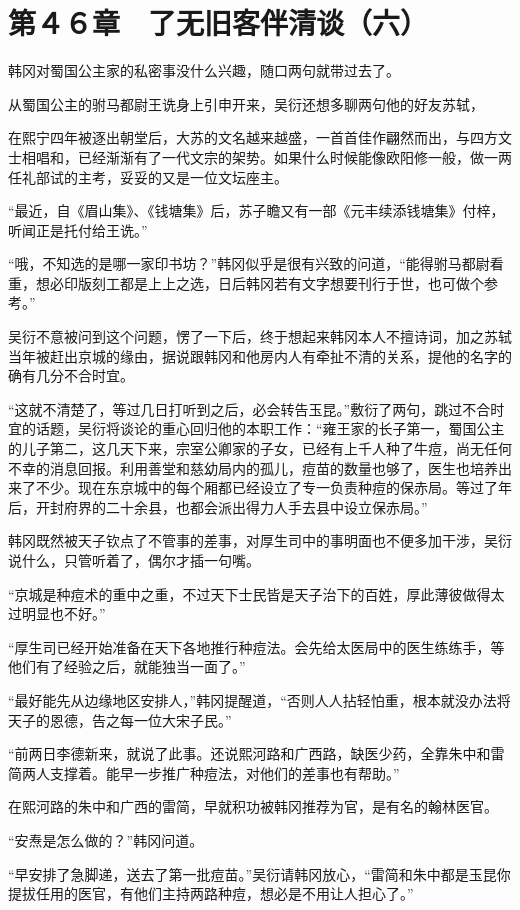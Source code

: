 \section{第４６章　了无旧客伴清谈（六）}

韩冈对蜀国公主家的私密事没什么兴趣，随口两句就带过去了。

从蜀国公主的驸马都尉王诜身上引申开来，吴衍还想多聊两句他的好友苏轼，

在熙宁四年被逐出朝堂后，大苏的文名越来越盛，一首首佳作翩然而出，与四方文士相唱和，已经渐渐有了一代文宗的架势。如果什么时候能像欧阳修一般，做一两任礼部试的主考，妥妥的又是一位文坛座主。

“最近，自《眉山集》、《钱塘集》后，苏子瞻又有一部《元丰续添钱塘集》付梓，听闻正是托付给王诜。”

“哦，不知选的是哪一家印书坊？”韩冈似乎是很有兴致的问道，“能得驸马都尉看重，想必印版刻工都是上上之选，日后韩冈若有文字想要刊行于世，也可做个参考。”

吴衍不意被问到这个问题，愣了一下后，终于想起来韩冈本人不擅诗词，加之苏轼当年被赶出京城的缘由，据说跟韩冈和他房内人有牵扯不清的关系，提他的名字的确有几分不合时宜。

“这就不清楚了，等过几日打听到之后，必会转告玉昆。”敷衍了两句，跳过不合时宜的话题，吴衍将谈论的重心回归他的本职工作：“雍王家的长子第一，蜀国公主的儿子第二，这几天下来，宗室公卿家的子女，已经有上千人种了牛痘，尚无任何不幸的消息回报。利用善堂和慈幼局内的孤儿，痘苗的数量也够了，医生也培养出来了不少。现在东京城中的每个厢都已经设立了专一负责种痘的保赤局。等过了年后，开封府界的二十余县，也都会派出得力人手去县中设立保赤局。”

韩冈既然被天子钦点了不管事的差事，对厚生司中的事明面也不便多加干涉，吴衍说什么，只管听着了，偶尔才插一句嘴。

“京城是种痘术的重中之重，不过天下士民皆是天子治下的百姓，厚此薄彼做得太过明显也不好。”

“厚生司已经开始准备在天下各地推行种痘法。会先给太医局中的医生练练手，等他们有了经验之后，就能独当一面了。”

“最好能先从边缘地区安排人，”韩冈提醒道，“否则人人拈轻怕重，根本就没办法将天子的恩德，告之每一位大宋子民。”

“前两日李德新来，就说了此事。还说熙河路和广西路，缺医少药，全靠朱中和雷简两人支撑着。能早一步推广种痘法，对他们的差事也有帮助。”

在熙河路的朱中和广西的雷简，早就积功被韩冈推荐为官，是有名的翰林医官。

“安焘是怎么做的？”韩冈问道。

“早安排了急脚递，送去了第一批痘苗。”吴衍请韩冈放心，“雷简和朱中都是玉昆你提拔任用的医官，有他们主持两路种痘，想必是不用让人担心了。”

